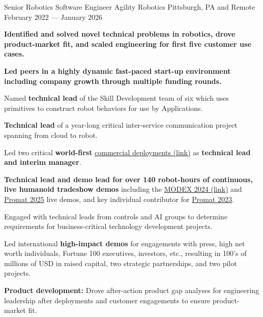 \begin{cventries}
  \cventry
    {Senior Robotics Software Engineer} %
    {Agility Robotics} %
    {Pittsburgh, PA and Remote} %
    {February 2022 --- January 2026} %
    {
      \begin{cvitems} %
        \item{\textbf{Identified and solved novel technical problems in robotics, drove product-market fit, and scaled engineering for first five customer use cases.}}
        \item{\textbf{Led peers in a highly dynamic fast-paced start-up environment including company growth through multiple funding rounds.}}
        \item{Named \textbf{technical lead} of the Skill Development team of six which uses primitives to construct robot behaviors for use by Applications.}
        \item{\textbf{Technical lead} of a year-long critical inter-service communication project spanning from cloud to robot.}
        \item{Led two critical \textbf{world-first} \href{https://www.youtube.com/watch?v=AJpTpUqjgrY}{commercial deployments (link)} as \textbf{technical lead and interim manager}.}
        \item{\textbf{Technical lead and demo lead for over 140 robot-hours of continuous, live humanoid tradeshow demos} including the \href{https://www.youtube.com/watch?v=5wMHayDVoFk}{MODEX 2024 (link)} and \href{https://www.youtube.com/watch?v=mQZHkXiVi5M}{Promat 2025} live demos, and key individual contributor for \href{https://www.youtube.com/watch?v=FhlUI2xDxdE}{Promat 2023}.}
        \item{Engaged with technical leads from controls and AI groups to determine requirements for business-critical technology development projects.}
        \item{Led international \textbf{high-impact demos} for engagements with press, high net worth individuals, Fortune 100 executives, investors, etc., resulting in 100's of millions of USD in raised capital, two strategic partnerships, and two pilot projects.}
        \item{\textbf{Product development:} Drove after-action product gap analyses for engineering leadership after deployments and customer engagements to ensure product-market fit.}

\end{cvitems}}
\end{cventries}
